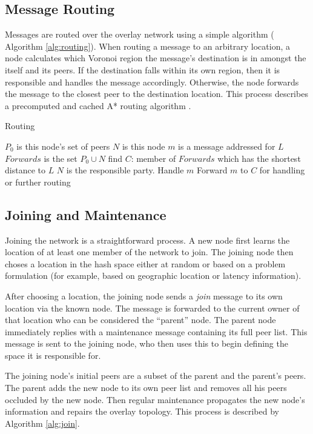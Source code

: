 \documentclass[11pt]{IEEEtran} %
\begin{document}
\subsection{Message Routing}
Messages are routed over the overlay network using a simple algorithm ( Algorithm \ref{alg:routing}). 
When routing a message to an arbitrary location, a node calculates which Voronoi region the message's destination is in amongst the itself and its peers. If the destination falls within its own region, then it is responsible and handles the message accordingly. Otherwise, the node forwards the message to the closest peer to the destination location. This process describes a precomputed and cached A* routing  algorithm \cite{astar} . 

\begin{algorithm}
\caption{Routing}
\label{alg:routing}
\begin{algorithmic}[1]  %
	\STATE $P_0$ is this node's set of peers
    \STATE $N$ is this node
	\STATE $m$ is a message addressed for $L$
    \STATE $Forwards$ is the set $P_0\cup{}N$
    \STATE find $C$: member of $Forwards$ which has the shortest distance to $L$
    	\STATE $N$ is the responsible party.
        \STATE Handle $m$
    \ELSE
    	\STATE Forward $m$ to $C$ for handling or further routing
    \ENDIF
\end{algorithmic}
\end{algorithm}

\subsection{Joining and Maintenance}
Joining the network is a straightforward process. A new node first learns the location of at least one member of the network to join. The joining node then choses a location in the hash space either at random or based on a problem formulation (for example, based on geographic location or latency information).

After choosing a location, the joining node sends a \textit{join} message to its own location via the known node.
The message is forwarded to the current owner of that location who can be considered the ``parent'' node.
The parent node immediately replies with a maintenance message containing its full peer list. 
This message is sent to the joining node, who then uses this to begin defining the space it is responsible for. 

The joining node's initial peers are a subset of the parent and the parent's peers. The parent adds the new node to its own peer list and removes all his peers occluded by the new node.  Then regular maintenance propagates the new node's information and repairs the overlay topology.  This process is described by Algorithm \ref{alg:join}.
\end{document}
